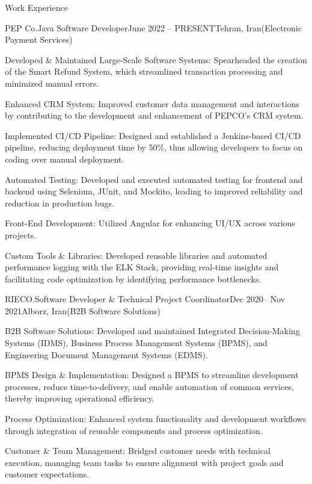 \documentclass[]{kyvernitis-resume}
\begin{document}
\begin{section}{Work Experience}
    \begin{subsection}{PEP Co.}{Java Software Developer}{June 2022 -- PRESENT}{Tehran, Iran}{(Electronic Payment Services)}

		\item Developed \& Maintained Large-Scale Software Systems: Spearheaded the creation of the Smart Refund System, which streamlined transaction processing and minimized manual errors.
		\item Enhanced CRM System: Improved customer data management and interactions by contributing to the development and enhancement of PEPCO's CRM system.
		\item Implemented CI/CD Pipeline: Designed and established a Jenkins-based CI/CD pipeline, reducing deployment time by 50\%, thus allowing developers to focus on coding over manual deployment.

		\item Automated Testing: Developed and executed automated testing for frontend and backend using Selenium, JUnit, and Mockito, leading to improved reliability and reduction in production bugs.
		\item Front-End Development: Utilized Angular for enhancing UI/UX across various projects.
		\item Custom Tools \& Libraries: Developed reusable libraries and automated performance logging with the ELK Stack, providing real-time insights and facilitating code optimization by identifying performance bottlenecks.

    \end{subsection}


 \begin{subsection}{RIECO.}{Software Developer  \& Technical Project Coordinator}{Dec 2020-- Nov 2021}{Alborz, Iran}{(B2B Software Solutions)}
	
	\item B2B Software Solutions: Developed and maintained Integrated Decision-Making Systems (IDMS), Business Process Management Systems (BPMS), and Engineering Document Management Systems (EDMS).
	\item BPMS Design \& Implementation: Designed a BPMS to streamline development processes, reduce time-to-delivery, and enable automation of common services, thereby improving operational efficiency.
	\item Process Optimization: Enhanced system functionality and development workflows through integration of reusable components and process optimization.
	\item Customer \& Team Management: Bridged customer needs with technical execution, managing team tasks to ensure alignment with project goals and customer expectations.


\end{subsection}
\end{section}
\end{document}
